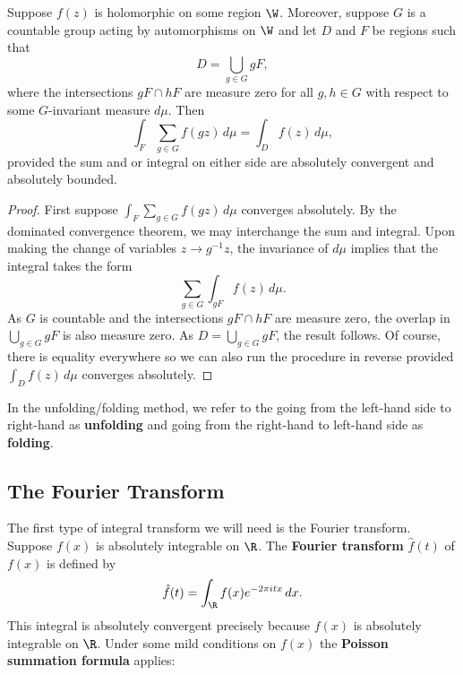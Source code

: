         \begin{theorem}
          Suppose $f(z)$ is holomorphic on some region $\W$. Moreover, suppose $G$ is a countable group acting by automorphisms on $\W$ and let $D$ and $F$ be regions such that
          \[
            D = \bigcup_{g \in G}gF,
          \]
          where the intersections $gF \cap hF$ are measure zero for all $g,h \in G$ with respect to some $G$-invariant measure $d\mu$. Then 
          \[
            \int_{F}\sum_{g \in G}f(g z)\,d\mu = \int_{D}f(z)\,d\mu,
          \]
          provided the sum and or integral on either side are absolutely convergent and absolutely bounded.
        \end{theorem}
        \begin{proof}
          First suppose $\int_{F}\sum_{g \in G}f(g z)\,d\mu$ converges absolutely. By the dominated convergence theorem, we may interchange the sum and integral. Upon making the change of variables $z \to g^{-1}z$, the invariance of $d\mu$ implies that the integral takes the form
          \[
            \sum_{g \in G}\int_{gF}f(z)\,d\mu.
          \]
          As $G$ is countable and the intersections $gF \cap hF$ are measure zero, the overlap in $\bigcup_{g \in G}gF$ is also measure zero. As $D = \bigcup_{g \in G}gF$, the result follows. Of course, there is equality everywhere so we can also run the procedure in reverse provided $\int_{D}f(z)\,d\mu$ converges absolutely.
        \end{proof}

        In the unfolding/folding method, we refer to the going from the left-hand side to right-hand as \textbf{unfolding} and going from the right-hand to left-hand side as \textbf{folding}.
      \subsection*{The Fourier Transform}
        The first type of integral transform we will need is the Fourier transform. Suppose $f(x)$ is absolutely integrable on $\R$. The \textbf{Fourier transform} $\hat{f}(t)$ of $f(x)$ is defined by
        \[
          \hat{f}(t) = \int_{\R}f(x)e^{-2\pi itx}\,dx.
        \]
        This integral is absolutely convergent precisely because $f(x)$ is absolutely integrable on $\R$. Under some mild conditions on $f(x)$ the \textbf{Poisson summation formula} applies:

